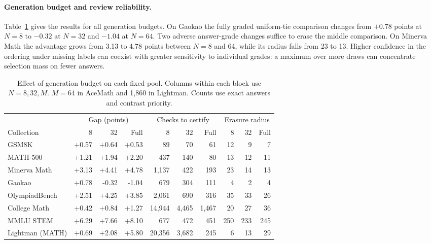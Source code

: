 \documentclass[10pt,letterpaper]{article}
\begin{document}
\paragraph{Generation budget and review reliability.}
Table~\ref{tab:scaling} gives the results for all generation budgets. On Gaokao the fully graded uniform-tie comparison changes from $+0.78$ points at $N=8$ to $-0.32$ at $N=32$ and $-1.04$ at $N=64$. Two adverse answer-grade changes suffice to erase the middle comparison. On Minerva Math the advantage grows from 3.13 to 4.78 points between $N=8$ and 64, while its radius falls from 23 to 13. Higher confidence in the ordering under missing labels can coexist with greater sensitivity to individual grades: a maximum over more draws can concentrate selection mass on fewer answers.

\begin{table}[!ht]\centering\scriptsize
\caption{Effect of generation budget on each fixed pool. Columns within each block use $N=8,32,M$. $M=64$ in AceMath and 1,860 in Lightman. Counts use exact answers and contrast priority.}\label{tab:scaling}
\begin{tabular}{lrrr rrr rrr}\toprule
&\multicolumn{3}{c}{Gap (points)}&\multicolumn{3}{c}{Checks to certify}&\multicolumn{3}{c}{Erasure radius}\\
Collection & 8 & 32 & Full & 8 & 32 & Full & 8 & 32 & Full\\\midrule
GSM8K & +0.57 & +0.64 & +0.53 & 89 & 70 & 61 & 12 & 9 & 7 \\
MATH-500 & +1.21 & +1.94 & +2.20 & 437 & 140 & 80 & 13 & 12 & 11 \\
Minerva Math & +3.13 & +4.41 & +4.78 & 1,137 & 422 & 193 & 23 & 14 & 13 \\
Gaokao & +0.78 & -0.32 & -1.04 & 679 & 304 & 111 & 4 & 2 & 4 \\
OlympiadBench & +2.51 & +4.25 & +3.85 & 2,061 & 690 & 316 & 35 & 33 & 26 \\
College Math & +0.42 & +0.84 & +1.27 & 14,944 & 4,465 & 1,467 & 20 & 27 & 36 \\
MMLU STEM & +6.29 & +7.66 & +8.10 & 677 & 472 & 451 & 250 & 233 & 245 \\
Lightman (MATH) & +0.69 & +2.08 & +5.80 & 20,356 & 3,682 & 245 & 6 & 13 & 29 \\
\bottomrule\end{tabular}
\end{table}
\end{document}
